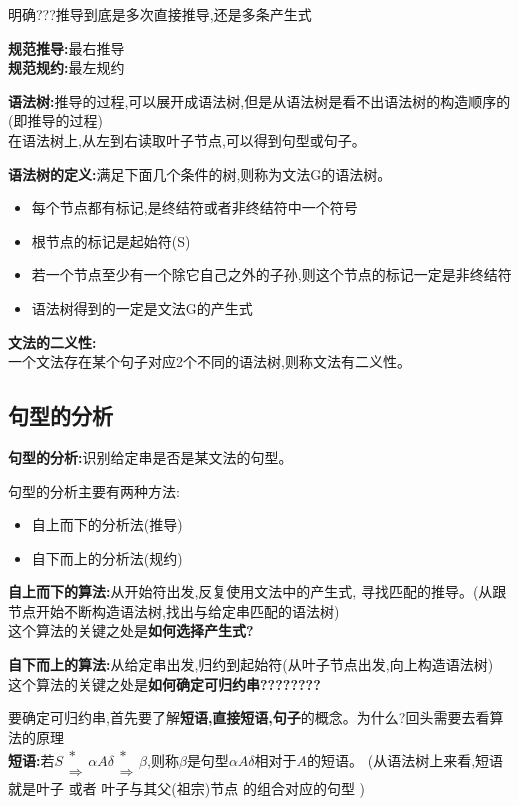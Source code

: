 \documentclass[UTF8,a4paper]{ctexart}
\newcommand{\spaceline}{\vspace{\baselineskip}}
\begin{document}
  {\color{red}明确???推导到底是多次直接推导,还是多条产生式}

  \textbf{规范推导:}最右推导\\
  \textbf{规范规约:}最左规约

  \textbf{语法树:}推导的过程,可以展开成语法树,但是从语法树是看不出语法树的构造顺序的(即推导的过程)\\
  在语法树上,从左到右读取叶子节点,可以得到句型或句子。

  \textbf{语法树的定义:}满足下面几个条件的树,则称为文法G的语法树。
  \begin{itemize}
    \item 每个节点都有标记,是终结符或者非终结符中一个符号
    \item 根节点的标记是起始符(S)
    \item 若一个节点至少有一个除它自己之外的子孙,则这个节点的标记一定是非终结符
    \item 语法树得到的一定是文法G的产生式
  \end{itemize}

  \textbf{文法的二义性:}\\
  一个文法存在某个句子对应2个不同的语法树,则称文法有二义性。

  \subsection{句型的分析}
  \textbf{句型的分析:}识别给定串是否是某文法的句型。

  句型的分析主要有两种方法:
  \begin{itemize}
    \item 自上而下的分析法(推导)
    \item 自下而上的分析法(规约)
  \end{itemize}

  \textbf{自上而下的算法:}从开始符出发,反复使用文法中的产生式,
  寻找匹配的推导。(从跟节点开始不断构造语法树,找出与给定串匹配的语法树)\\
  这个算法的关键之处是\textbf{如何选择产生式?}

  \spaceline
  \textbf{自下而上的算法:}从给定串出发,归约到起始符(从叶子节点出发,向上构造语法树)\\
  这个算法的关键之处是\textbf{如何确定可归约串????????}

  \spaceline
  要确定可归约串,首先要了解\textbf{短语,直接短语,句子}的概念。{\color{red}为什么?回头需要去看算法的原理}\\
  \textbf{短语:}若$\renewcommand{\arraystretch}{0.5}S\begin{array}{c} * \\ \Rightarrow \end{array} \alpha A\delta
  \begin{array}{c} * \\ \Rightarrow \end{array} \beta$,则称$\beta$是句型{\color{red}$\alpha A \delta$}相对于$A$的短语。
    (从语法树上来看,短语就是叶子 或者 叶子与其父(祖宗)节点 的组合对应的句型 )
\end{document}
